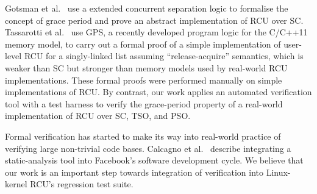 Gotsman et al.~\cite{YangESOP13RCU} use a extended concurrent separation logic 
to formalise the concept 
of grace period and prove an abstract implementation of RCU over SC.
%
Tassarotti et al.~\cite{DreyerPLDI15RCU} use GPS, a recently 
developed program logic for the C/C++11 memory model, to carry out 
a formal proof of a simple implementation of user-level 
RCU for a singly-linked list assuming ``release-acquire'' semantics, 
which is weaker than SC but stronger than memory models used by
real-world RCU implementations.
%
These formal proofs were performed manually on simple implementations 
of RCU. By contrast, our work applies an automated verification tool with a 
test harness to verify the grace-period property of a real-world
implementation of RCU over SC, TSO, and PSO.

Formal verification has started to make its way into real-world practice 
of verifying large non-trivial code bases. Cal\-ca\-gno et al.~\cite{CalcagnoNASA15} 
describe integrating a static-analysis tool
into Facebook's software development cycle.
We believe that our work is an 
important step towards integration of verification into Linux-kernel RCU's 
regression test suite.
